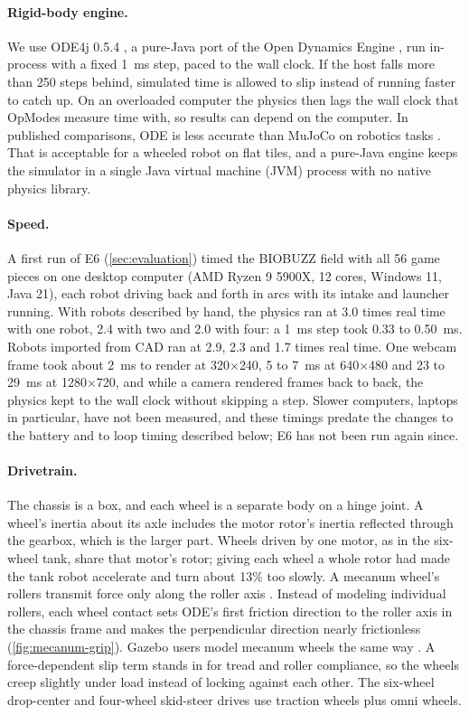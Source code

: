 \documentclass[10pt,twocolumn,letterpaper]{article}
\begin{document}
\paragraph{Rigid-body engine.} We use ODE4j 0.5.4 \citep{zaschke2026ode4j}, a pure-Java port of the Open Dynamics Engine \citep{smith2004ode}, run in-process with a fixed 1~ms step, paced to the wall clock. If the host falls more than 250 steps behind, simulated time is allowed to slip instead of running faster to catch up. On an overloaded computer the physics then lags the wall clock that OpModes measure time with, so results can depend on the computer. In published comparisons, ODE is less accurate than MuJoCo on robotics tasks \citep{erez2015simulation,collins2021review}. That is acceptable for a wheeled robot on flat tiles, and a pure-Java engine keeps the simulator in a single Java virtual machine (JVM) process with no native physics library.

\paragraph{Speed.} A first run of E6 (\cref{sec:evaluation}) timed the BIOBUZZ field with all 56 game pieces on one desktop computer (AMD Ryzen 9 5900X, 12 cores, Windows 11, Java 21), each robot driving back and forth in arcs with its intake and launcher running. With robots described by hand, the physics ran at 3.0 times real time with one robot, 2.4 with two and 2.0 with four: a 1~ms step took 0.33 to 0.50~ms. Robots imported from CAD ran at 2.9, 2.3 and 1.7 times real time. One webcam frame took about 2~ms to render at 320$\times$240, 5 to 7~ms at 640$\times$480 and 23 to 29~ms at 1280$\times$720, and while a camera rendered frames back to back, the physics kept to the wall clock without skipping a step. Slower computers, laptops in particular, have not been measured, and these timings predate the changes to the battery and to loop timing described below; E6 has not been run again since.

\paragraph{Drivetrain.} The chassis is a box, and each wheel is a separate body on a hinge joint. A wheel's inertia about its axle includes the motor rotor's inertia reflected through the gearbox, which is the larger part. Wheels driven by one motor, as in the six-wheel tank, share that motor's rotor; giving each wheel a whole rotor had made the tank robot accelerate and turn about 13\% too slowly. A mecanum wheel's rollers transmit force only along the roller axis \citep{ilon1975wheels,muir1987kinematic}. Instead of modeling individual rollers, each wheel contact sets ODE's first friction direction to the roller axis in the chassis frame and makes the perpendicular direction nearly frictionless (\cref{fig:mecanum-grip}). Gazebo users model mecanum wheels the same way \citep{gazebo2023mecanum}. A force-dependent slip term stands in for tread and roller compliance, so the wheels creep slightly under load instead of locking against each other. The six-wheel drop-center and four-wheel skid-steer drives use traction wheels plus omni wheels.
\end{document}
